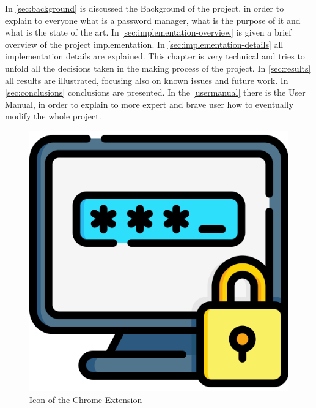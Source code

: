 In \autoref{sec:background} is discussed the Background of the project, in order to explain to everyone what is a password manager, what is the purpose of it and what is the state of the art. In \autoref{sec:implementation-overview} is given a brief overview of the project implementation. In \autoref{sec:implementation-details} all implementation details are explained. This chapter is very technical and tries to unfold all the decisions taken in the making process of the project.
In \autoref{sec:results} all results are illustrated, focusing also on known issues and future work. In \autoref{sec:conclusions} conclusions are presented. In the \autoref{usermanual} there is the User Manual, in order to explain to more expert and brave user how to eventually modify the whole project.

\vspace*{1cm}
\begin{figure}[H]
	\centering
	\includegraphics[width=0.4\linewidth]{images/extension/password.png}
	\caption{Icon of the Chrome Extension}
	\label{fig:extension-icon}
\end{figure}